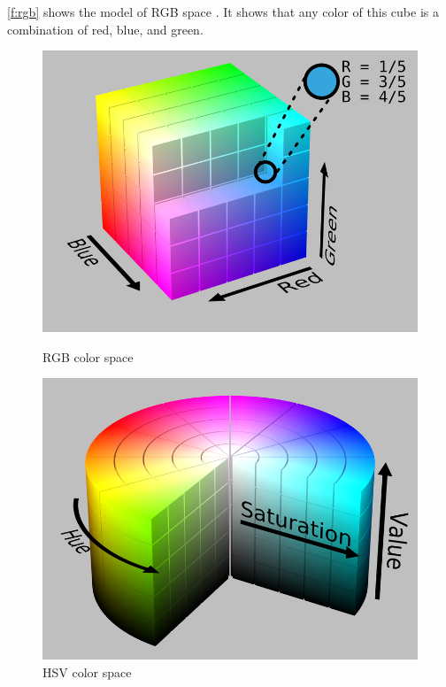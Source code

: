 \ref{f:rgb} shows the model of RGB space \cite{rgb}.
It shows that any color of this cube is a combination of red, blue, and green.

\begin{figure}[htbp]
\begin{minipage}[t]{0.45\linewidth}
    \includegraphics[width=\linewidth]{images/RGB.png}
    \caption{RGB color space}
    \label{f:rgb}
\end{minipage}
    \hfill
\begin{minipage}[t]{0.45\linewidth}
    \includegraphics[width=\linewidth]{images/HSV.png}
    \caption{HSV color space}
    \label{f:hsv}
\end{minipage} 
\end{figure}


